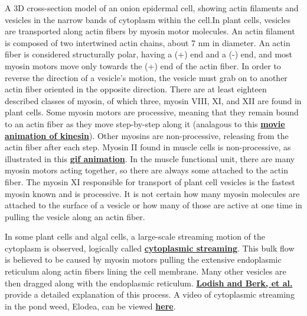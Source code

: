 \documentclass{../lab}
\begin{document}
A 3D cross-section model of an onion epidermal cell, showing actin filaments and vesicles in the narrow bands of cytoplasm within the cell.In plant cells, vesicles are transported along actin fibers by myosin motor molecules. An actin filament is composed of two intertwined actin chains, about 7 nm in diameter. An actin fiber is considered structurally polar, having a (+) end and a (-) end, and most myosin motors move only towards the (+) end of the actin fiber. In order to reverse the direction of a vesicle's motion, the vesicle must grab on to another actin fiber oriented in the opposite direction. There are at least eighteen described classes of myosin, of which three, myosin VIII, XI, and XII are found in plant cells. Some myosin motors are processive, meaning that they remain bound to an actin fiber as they move step-by-step along it (analagous to this \href{https://berkeley-physics111b.github.io/assets/pdf/oldwebsitestructure/Kinesin_Motion.mp4}{\textbf{movie animation of kinesin}}). Other myosins are non-processive, releasing from the actin fiber after each step. Myosin II found in muscle cells is non-processive, as illustrated in this \href{https://berkeley-physics111b.github.io/assets/pdf/oldwebsitestructure/BMC/References/actin.gif}{\textbf{gif animation}}.  In the muscle functional unit, there are many myosin motors acting together, so there are always some attached to the actin fiber. The myosin XI responsible for transport of plant cell vesicles is the fastest myosin known and is processive. It is not certain how many myosin molecules are attached to the surface of a vesicle or how many of those are active at one time in pulling the vesicle along an actin fiber.

In some plant cells and algal cells, a large-scale streaming motion of the cytoplasm is observed, logically called \href{https://drive.google.com/file/d/11dTpwbLwxOk2RSkeMMbuF_-GOCxmNsw0/view?usp=drive_link}{\textbf{cytoplasmic streaming}}. This bulk flow is believed to be caused by myosin motors pulling the extensive endoplasmic reticulum along actin fibers lining the cell membrane. Many other vesicles are then dragged along with the endoplasmic reticulum. \href{https://berkeley-physics111b.github.io/assets/pdf/oldwebsitestructure/Lodish_and_Berk_Figure_18-40.pdf}{\textbf{Lodish and Berk, et al.}} provide a detailed explanation of this process. A video of cytoplasmic streaming in the pond weed, Elodea, can be viewed \href{https://berkeley-physics111b.github.io/assets/pdf/oldwebsitestructure/BMC/References/Cytoplasmic_Streaming_Elodea.mov}{\textbf{here}}.
\end{document}
